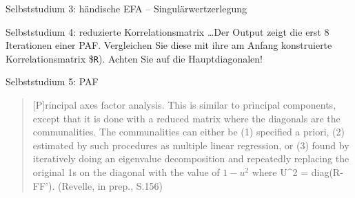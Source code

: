 \documentclass[
  ignorenonframetext,
]{beamer}
\newenvironment{Shaded}{\begin{snugshade}}{\end{snugshade}}
\newcommand{\AttributeTok}[1]{\textcolor[rgb]{0.77,0.63,0.00}{#1}}
\newcommand{\CommentTok}[1]{\textcolor[rgb]{0.56,0.35,0.01}{\textit{#1}}}
\newcommand{\ConstantTok}[1]{\textcolor[rgb]{0.00,0.00,0.00}{#1}}
\newcommand{\DecValTok}[1]{\textcolor[rgb]{0.00,0.00,0.81}{#1}}
\newcommand{\FunctionTok}[1]{\textcolor[rgb]{0.00,0.00,0.00}{#1}}
\newcommand{\NormalTok}[1]{#1}
\newcommand{\OtherTok}[1]{\textcolor[rgb]{0.56,0.35,0.01}{#1}}
\newcommand{\SpecialCharTok}[1]{\textcolor[rgb]{0.00,0.00,0.00}{#1}}
\begin{document}
\begin{frame}[fragile]{Selbststudium 3: händische EFA --
Singulärwertzerlegung}
\protect\hypertarget{selbststudium-3-huxe4ndische-efa-singuluxe4rwertzerlegung}{}
\begin{Shaded}
\end{Shaded}
\end{frame}

\begin{frame}{Selbststudium 4: reduzierte Korrelationsmatrix}
\protect\hypertarget{selbststudium-4-reduzierte-korrelationsmatrix}{}
\ldots Der Output zeigt die erst 8 Iterationen einer PAF. Vergleichen
Sie diese mit ihre am Anfang konstruierte Korrelationsmatrix
\$\texttt{R}). Achten Sie auf die Hauptdiagonalen!
\end{frame}

\begin{frame}{Selbststudium 5: PAF}
\protect\hypertarget{selbststudium-5-paf}{}
\begin{quote}
{[}P{]}rincipal axes factor analysis. This is similar to principal
components, except that it is done with a reduced matrix where the
diagonals are the communalities. The communalities can either be (1)
specified a priori, (2) estimated by such procedures as multiple linear
regression, or (3) found by iteratively doing an eigenvalue
decomposition and repeatedly replacing the original 1s on the diagonal
with the value of \(1-u^2\) where U\^{}2 = diag(R-FF'). (Revelle, in
prep., S.156)
\end{quote}
\end{frame}
\end{document}
